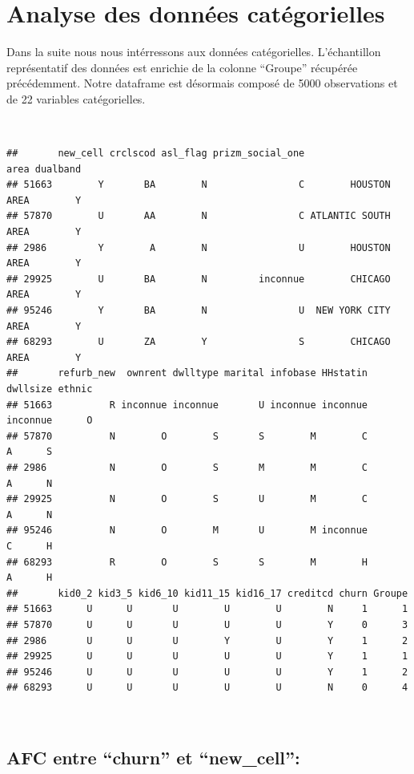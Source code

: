 \documentclass[]{imsart}
\numberwithin{equation}{section}
\theoremstyle{plain}
\begin{document}
\hypertarget{analyse-des-donnuxe9es-catuxe9gorielles}{%
\section{Analyse des données catégorielles}\label{analyse-des-donnuxe9es-catuxe9gorielles}}

Dans la suite nous nous intérressons aux données catégorielles. L'échantillon représentatif des données est enrichie de la colonne ``Groupe'' récupérée précédemment. Notre dataframe est désormais composé de 5000 observations et de 22 variables catégorielles.

~

\begin{verbatim}
##       new_cell crclscod asl_flag prizm_social_one                area dualband
## 51663        Y       BA        N                C        HOUSTON AREA        Y
## 57870        U       AA        N                C ATLANTIC SOUTH AREA        Y
## 2986         Y        A        N                U        HOUSTON AREA        Y
## 29925        U       BA        N         inconnue        CHICAGO AREA        Y
## 95246        Y       BA        N                U  NEW YORK CITY AREA        Y
## 68293        U       ZA        Y                S        CHICAGO AREA        Y
##       refurb_new  ownrent dwlltype marital infobase HHstatin dwllsize ethnic
## 51663          R inconnue inconnue       U inconnue inconnue inconnue      O
## 57870          N        O        S       S        M        C        A      S
## 2986           N        O        S       M        M        C        A      N
## 29925          N        O        S       U        M        C        A      N
## 95246          N        O        M       U        M inconnue        C      H
## 68293          R        O        S       S        M        H        A      H
##       kid0_2 kid3_5 kid6_10 kid11_15 kid16_17 creditcd churn Groupe
## 51663      U      U       U        U        U        N     1      1
## 57870      U      U       U        U        U        Y     0      3
## 2986       U      U       U        Y        U        Y     1      2
## 29925      U      U       U        U        U        Y     1      1
## 95246      U      U       U        U        U        Y     1      2
## 68293      U      U       U        U        U        N     0      4
\end{verbatim}

~

\hypertarget{afc-entre-churn-et-new_cell}{%
\subsection{AFC entre ``churn'' et ``new\_cell'':}\label{afc-entre-churn-et-new_cell}}
\end{document}
